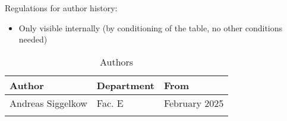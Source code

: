 Regulations for author history:
\begin{itemize}
  \item Only visible internally (by conditioning of the table, no other conditions needed)
\end{itemize}

\begin{table}[H]
\caption{Authors}
\label{tab:gpioauth01}
\centering
\begin{tabularx}{\textwidth}{|X |X |X |}
  \hline
  Author & Department & From \\
  \hline
  \hline
  Andreas Siggelkow & Fac. E & February 2025 \\
  \hline
  && \\
  \hline
\end{tabularx}
\end{table}
